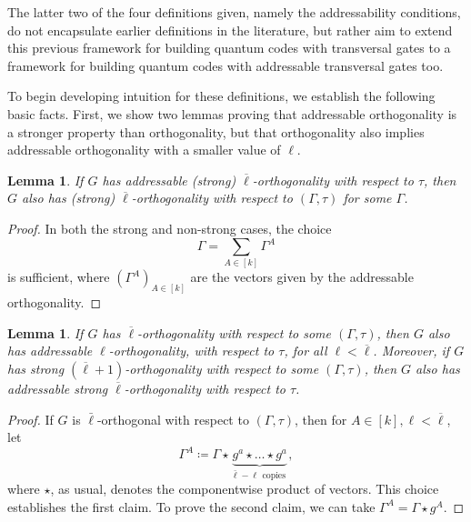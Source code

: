\documentclass[11pt]{article}
\newtheorem{lemma}[theorem]{Lemma}
\theoremstyle{definition}
\newcommand*{\ol}{\overline}
\begin{document}
The latter two of the four definitions given, namely the addressability conditions, do not encapsulate earlier definitions in the literature, but rather aim to extend this previous framework for building quantum codes with transversal gates to a framework for building quantum codes with addressable transversal gates too.

To begin developing intuition for these definitions, we establish the following basic facts. First, we show two lemmas proving that addressable orthogonality is a stronger property than orthogonality, but that orthogonality also implies addressable orthogonality  with a smaller value of $\ell$.

\begin{lemma}\label{lem:address_to_ortho}
    If $G$ has addressable (strong) $\ol\ell$-orthogonality with respect to $\tau$, then $G$ also has (strong) $\ol\ell$-orthogonality with respect to $(\Gamma,\tau)$ for some $\Gamma$.
\end{lemma}
\begin{proof}
    In both the strong and non-strong cases, the choice
    \begin{equation}
        \Gamma = \sum_{A \in [k]}\Gamma^A
    \end{equation}
    is sufficient, where $(\Gamma^A)_{A \in [k]}$ are the vectors given by the addressable orthogonality.
\end{proof}

\begin{lemma}\label{lem:ortho_to_address}
    If $G$ has $\ol{\ell}$-orthogonality with respect to some $(\Gamma,\tau)$, then $G$ also has addressable $\ell$-orthogonality, with respect to $\tau$, for all $\ell < \ol{\ell}$.
    Moreover, if $G$ has strong $(\ol\ell+1)$-orthogonality with respect to some $(\Gamma,\tau)$, then $G$ also has addressable strong $\ol\ell$-orthogonality with respect to $\tau$.
\end{lemma}

\begin{proof}
    If $G$ is $\bar{\ell}$-orthogonal with respect to $(\Gamma,\tau)$, then for $A\in [k], \ell < \ol\ell$, let
    \begin{equation}
        \Gamma^A\coloneq \Gamma \star \underbrace{g^a \star \ldots \star g^a}_{\bar{\ell}-\ell \text{ copies }},
    \end{equation}
    where $\star$, as usual, denotes the componentwise product of vectors. This choice establishes the first claim.
    To prove the second claim, we can take $\Gamma^A = \Gamma\star g^A$.
\end{proof}
\end{document}

